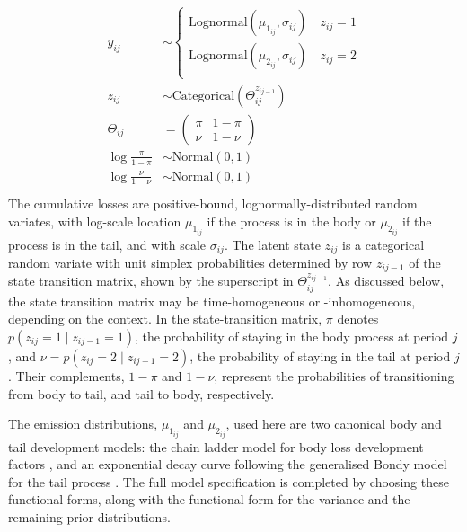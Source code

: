 \begin{align}
	\begin{split}
	\label{eq:hmm}
	y_{ij} &\sim \begin{cases}
        \mathrm{Lognormal}(\mu_{1_{ij}}, \sigma_{ij}) \quad z_{ij} = 1\\
        \mathrm{Lognormal}(\mu_{2_{ij}}, \sigma_{ij}) \quad z_{ij} = 2\\
	\end{cases}\\
    z_{ij} &\sim \mathrm{Categorical}(\Theta^{z_{ij-1}}_{ij})\\
    \Theta_{ij} &= \begin{pmatrix}
        \pi & 1 - \pi\\
        \nu & 1 - \nu
    \end{pmatrix}\\
    \log \frac{\pi}{1 - \pi} &\sim \mathrm{Normal}(0, 1)\\
    \log \frac{\nu}{1 - \nu} &\sim \mathrm{Normal}(0, 1)\\
	\end{split}
\end{align}
%
The cumulative losses are positive-bound, 
lognormally-distributed random variates,
with log-scale location $\mu_{1_{ij}}$ if the process is in the body
or $\mu_{2_{ij}}$ if the process is in the tail, and with scale $\sigma_{ij}$.
The latent state $z_{ij}$ is a categorical random variate
with unit simplex probabilities
determined by row $z_{ij - 1}$ of the state transition matrix, shown
by the superscript in $\Theta_{ij}^{z_{ij - 1}}$. 
As discussed below, the state transition matrix
may be time-homogeneous or -inhomogeneous, depending on the context.
In the state-transition matrix, 
$\pi$ denotes $p(z_{ij} = 1 \mid z_{ij-1} = 1)$, the 
probability of staying in the body
process at period $j$, and $\nu = p(z_{ij} = 2 \mid z_{ij-1} = 2)$,
the probability of staying in the tail at period $j$.
Their complements, $1 - \pi$ and $1 - \nu$, represent the
probabilities of transitioning from body to tail, and tail
to body, respectively.

The emission distributions, $\mu_{1_{ij}}$ and $\mu_{2_{ij}}$,
used here are two canonical body and tail development models:
the chain ladder model for body loss development factors
\citep{mack1993,englandverrall2002},
and an exponential decay curve following the generalised Bondy model
for the tail process \citep{tailfactors2013}.
The full model specification is completed by choosing these
functional forms, along with the functional form for the variance
and the remaining prior distributions.

